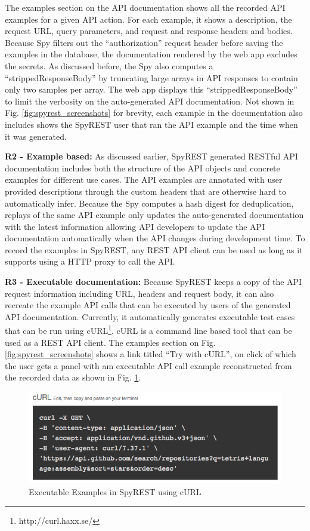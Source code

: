 \documentclass[conference]{IEEEtran}
\begin{document}
The examples section on the API documentation shows all the recorded API examples for a given API action. For each example, it shows a description, the request URL, query parameters, and request and response headers and bodies. Because Spy filters out the ``authorization'' request header before saving the examples in the database, the documentation rendered by the web app excludes the secrets. As discussed before, the Spy also computes a ``strippedResponseBody'' by truncating large arrays in API responses to contain only two samples per array. The web app displays this ``strippedResponseBody'' to limit the verbosity on the auto-generated API documentation. Not shown in Fig. \ref{fig:spyrest_screenshots} for brevity, each example in the documentation also includes shows the SpyREST user that ran the API example and the time when it was generated.

\textbf{R2 - Example based:} As discussed earlier, SpyREST generated RESTful API documentation includes both the structure of the API objects and concrete examples for different use cases. The API examples are annotated with user provided descriptions through the custom headers that are otherwise hard to automatically infer. Because the Spy computes a hash digest for deduplication, replays of the same API example only updates the auto-generated documentation with the latest information allowing API developers to update the API documentation automatically when the API changes during development time. To record the examples in SpyREST, any REST API client can be used as long as it supports using a HTTP proxy to call the API.

\textbf{R3 -  Executable documentation:} Because SpyREST keeps a copy of the API request information including URL, headers and request body, it can also recreate the example API calls that can be executed by users of the generated API documentation. Currently, it automatically generates executable test cases that can be run using cURL\footnote{http://curl.haxx.se/}. cURL is a command line based tool that can be used as a REST API client. The examples section on Fig. \ref{fig:spyrest_screenshots} shows a link titled ``Try with cURL'', on click of which the user gets a panel with am executable API call example reconstructed from the recorded data as shown in Fig. \ref{fig:curl}.

\begin{figure}[!tbh]
  \centering
  \includegraphics[width=\linewidth]{curl.png}
  \caption{Executable Examples in SpyREST using cURL}
  \label{fig:curl}
\end{figure}
\end{document}
